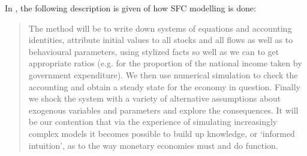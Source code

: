 \documentclass[twoside,a4paper,11pt]{article}
\begin{document}
In \cite{Godley2007}, the following description is given of how SFC modelling is done:
\begin{quotation} The method will be to write down systems of equations and accounting identities, attribute initial values to all stocks and all flows as well as to behavioural parameters, using stylized facts so well as we can to get appropriate ratios (e.g. for the proportion of the national income taken by government expenditure). We then use numerical simulation to check the accounting and obtain a steady state for the economy in question. Finally we shock the system with a variety of alternative assumptions about exogenous variables and parameters and explore the consequences. It will be our contention that via the experience of simulating increasingly complex models it becomes possible to build up knowledge, or ‘informed intuition’, as to the way monetary economies must and do function.
\end{quotation}
\end{document}
